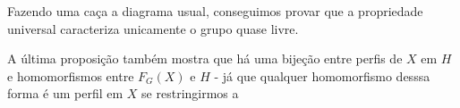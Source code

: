 \documentclass[11pt]{article}
\theoremstyle{definition}
\theoremstyle{definition}
\theoremstyle{definition}
\theoremstyle{definition}
\theoremstyle{definition}
\theoremstyle{definition}
\theoremstyle{definition}
\theoremstyle{definition}
\theoremstyle{definition}
\theoremstyle{definition}
\theoremstyle{definition}
\theoremstyle{definition}
\theoremstyle{definition}
\begin{document}
Fazendo uma caça a diagrama usual, conseguimos provar que a propriedade universal caracteriza unicamente o grupo quase livre.

A última proposição também mostra que há uma bijeção entre perfis de $X$ em $H$ e homomorfismos entre $F_G(X)$ e $H$ - já que qualquer homomorfismo desssa forma é um perfil em $X$ se restringirmos a
\end{document}

